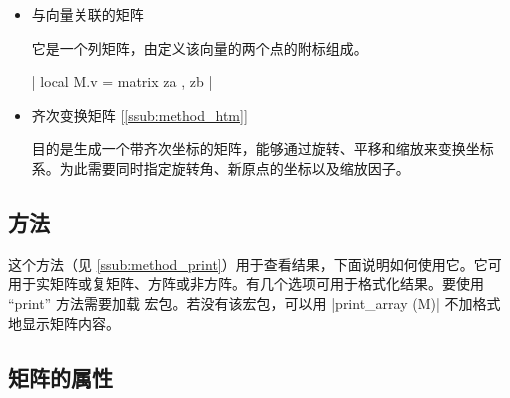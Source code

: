 \begin{itemize}
  |M.p = matrix({ { p.re }, { p.im } })|

\item  与向量关联的矩阵

 它是一个列矩阵，由定义该向量的两个点的附标组成。

| local M.v = matrix{ { za }, { zb } }|

\begin{tkzexample}[latex=.5\textwidth]
\end{tkzexample}



\item  齐次变换矩阵 [\ref{ssub:method_htm}]

 目的是生成一个带齐次坐标的矩阵，能够通过旋转、平移和缩放来变换坐标系。为此需要同时指定旋转角、新原点的坐标以及缩放因子。

\begin{tkzexample}[latex=.35\textwidth]
\end{tkzexample}

\end{itemize}

\subsection{方法 }
\label{sub:display_a_matrix_method_print}


这个方法（见 \ref{ssub:method_print}）用于查看结果，下面说明如何使用它。它可用于实矩阵或复矩阵、方阵或非方阵。有几个选项可用于格式化结果。要使用 “print” 方法需要加载  宏包。若没有该宏包，可以用 |print_array (M)| 不加格式地显示矩阵内容。

\begin{tkzexample}[latex=.5\textwidth]
\end{tkzexample}

\subsection{矩阵的属性}
\label{sub:attibutes_of_a_matrix}

